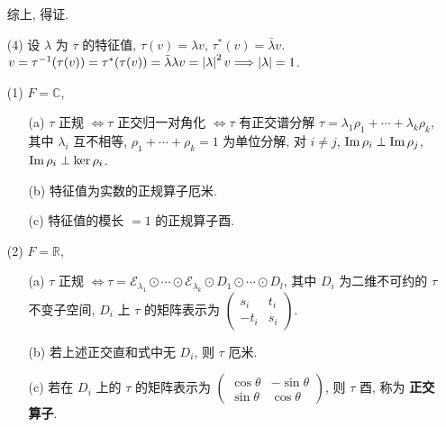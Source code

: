 \documentclass{note}
\begin{document}
\begin{pf}
\begin{itemize}
        综上, 得证.
        \item[(4)] 设 $\lambda$ 为 $\tau$ 的特征值, $\tau(v)=\lambda v$, $\tau^*(v)=\bar{\lambda}v$.\\
        $v=\tau^{-1}(\tau(v))=\tau^*(\tau(v))=\bar{\lambda}\lambda v=\left\lvert\lambda\right\rvert^2v\Longrightarrow\left\lvert\lambda\right\rvert=1$.
    \end{itemize}
\end{pf}

\begin{thm}
    \begin{itemize}
        \item[(1)] $F=\mathbb{C}$,
        \begin{itemize}
            \item[(a)] $\tau$ 正规 $\Longleftrightarrow\tau$ 正交归一对角化 $\Longleftrightarrow\tau$ 有正交谱分解 $\tau=\lambda_1\rho_1+\cdots+\lambda_k\rho_k$, 其中 $\lambda_i$ 互不相等, $\rho_1+\cdots+\rho_k=1$ 为单位分解, 对 $i\neq j$, $\operatorname{Im}\rho_i\perp\operatorname{Im}\rho_j$, $\operatorname{Im}\rho_i\perp\ker\rho_i$.
            \item[(b)] 特征值为实数的正规算子厄米.
            \item[(c)] 特征值的模长 $=1$ 的正规算子酉.
        \end{itemize}
        \item[(2)] $F=\mathbb{R}$,
        \begin{itemize}
            \item[(a)] $\tau$ 正规 $\Longleftrightarrow\tau=\mathcal{E}_{\lambda_1}\odot\cdots\odot\mathcal{E}_{\lambda_k}\odot D_1\odot\cdots\odot D_l$, 其中 $D_i$ 为二维不可约的 $\tau$ 不变子空间, $D_i$ 上 $\tau$ 的矩阵表示为 $\begin{pmatrix}
                s_i&t_i\\
                -t_i&s_i
            \end{pmatrix}$.
            \item[(b)] 若上述正交直和式中无 $D_i$, 则 $\tau$ 厄米.
            \item[(c)] 若在 $D_i$ 上的 $\tau$ 的矩阵表示为 $\begin{pmatrix}
                \cos\theta&-\sin\theta\\
                \sin\theta&\cos\theta
            \end{pmatrix}$, 则 $\tau$ 酉, 称为 \textbf{正交算子}.
        \end{itemize}
    \end{itemize}
\end{thm}
\end{document}
